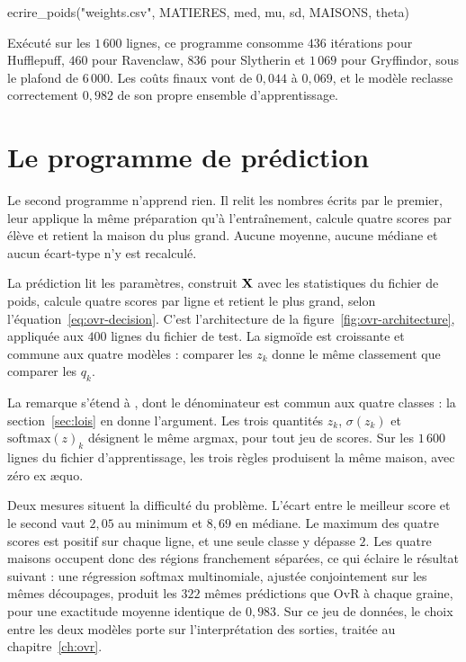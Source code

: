 \begin{pseudo}
ecrire\_poids("weights.csv", MATIERES, med, mu, sd, MAISONS, theta)
\end{pseudo}

Exécuté sur les $1\,600$ lignes, ce programme consomme $436$ itérations pour
Hufflepuff, $460$ pour Ravenclaw, $836$ pour Slytherin et $1\,069$ pour
Gryffindor, sous le plafond de $6\,000$. Les coûts finaux vont de $0{,}044$ à
$0{,}069$, et le modèle reclasse correctement $0{,}982$ de son propre ensemble
d'apprentissage.

\section{Le programme de prédiction}

\begin{lecture}
Le second programme n'apprend rien. Il relit les nombres écrits par le premier,
leur applique la même préparation qu'à l'entraînement, calcule quatre scores par
élève et retient la maison du plus grand. Aucune moyenne, aucune médiane et
aucun écart-type n'y est recalculé.
\end{lecture}

La prédiction lit les paramètres, construit $\mathbf{X}$ avec les statistiques du fichier
de poids, calcule quatre scores par ligne et retient le plus grand, selon
l'équation~\eqref{eq:ovr-decision}. C'est l'architecture de la
figure~\ref{fig:ovr-architecture}, appliquée aux $400$ lignes du fichier de test.
La sigmoïde est croissante et commune aux
quatre modèles : comparer les $z_k$ donne le même classement que comparer les
$q_k$.

La remarque s'étend à , dont le dénominateur est commun aux
quatre classes : la section~\ref{sec:lois} en donne l'argument. Les trois
quantités $z_k$, $\sigma(z_k)$ et $\mathrm{softmax}(z)_k$ désignent le même
argmax, pour tout jeu de scores. Sur les $1\,600$ lignes du fichier
d'apprentissage, les trois règles produisent la même maison, avec zéro ex æquo.

Deux mesures situent la difficulté du problème. L'écart entre le meilleur score
et le second vaut $2{,}05$ au minimum et $8{,}69$ en médiane. Le maximum des
quatre scores est positif sur chaque ligne, et une seule classe y dépasse $2$.
Les quatre maisons occupent donc des régions franchement séparées, ce qui éclaire
le résultat suivant : une régression softmax multinomiale, ajustée conjointement
sur les mêmes découpages, produit les $322$ mêmes prédictions que OvR à chaque
graine, pour une exactitude moyenne identique de $0{,}983$. Sur ce jeu de
données, le choix entre les deux modèles porte sur l'interprétation des sorties,
traitée au chapitre~\ref{ch:ovr}.

